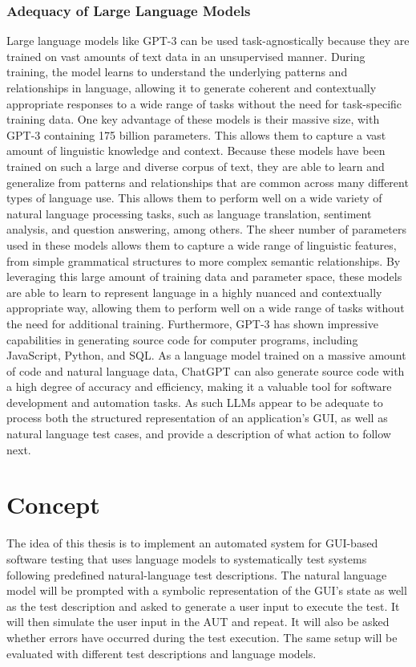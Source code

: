 \subsection{Adequacy of Large Language Models}
\label{subsec:SecondContent:ThirdSection}

Large language models like GPT-3 can be used task-agnostically because they are trained on vast amounts of text data in an unsupervised manner. During training, the model learns to understand the underlying patterns and relationships in language, allowing it to generate coherent and contextually appropriate responses to a wide range of tasks without the need for task-specific training data.
One key advantage of these models is their massive size, with GPT-3 containing 175 billion parameters.
This allows them to capture a vast amount of linguistic knowledge and context.
Because these models have been trained on such a large and diverse corpus of text, they are able to learn and generalize from patterns and relationships that are common across many different types of language use. This allows them to perform well on a wide variety of natural language processing tasks, such as language translation, sentiment analysis, and question answering, among others.
The sheer number of parameters used in these models allows them to capture a wide range of linguistic features, from simple grammatical structures to more complex semantic relationships. By leveraging this large amount of training data and parameter space, these models are able to learn to represent language in a highly nuanced and contextually appropriate way, allowing them to perform well on a wide range of tasks without the need for additional training.
Furthermore, GPT-3 has shown impressive capabilities in generating source code for computer programs, including JavaScript, Python, and SQL. As a language model trained on a massive amount of code and natural language data, ChatGPT can also generate source code with a high degree of accuracy and efficiency, making it a valuable tool for software development and automation tasks.
As such LLMs appear to be adequate to process both the structured representation of an application’s GUI, as well as natural language test cases, and provide a description of what action to follow next.


\chapter{Concept}

The idea of this thesis is to implement an automated system for GUI-based software testing that uses language models to systematically test systems following predefined natural-language test descriptions.
The natural language model will be prompted with a symbolic representation of the GUI’s state as well as the test description and asked to generate a user input to execute the test.
It will then simulate the user input in the AUT and repeat.
It will also be asked whether errors have occurred during the test execution.
The same setup will be evaluated with different test descriptions and language models.

